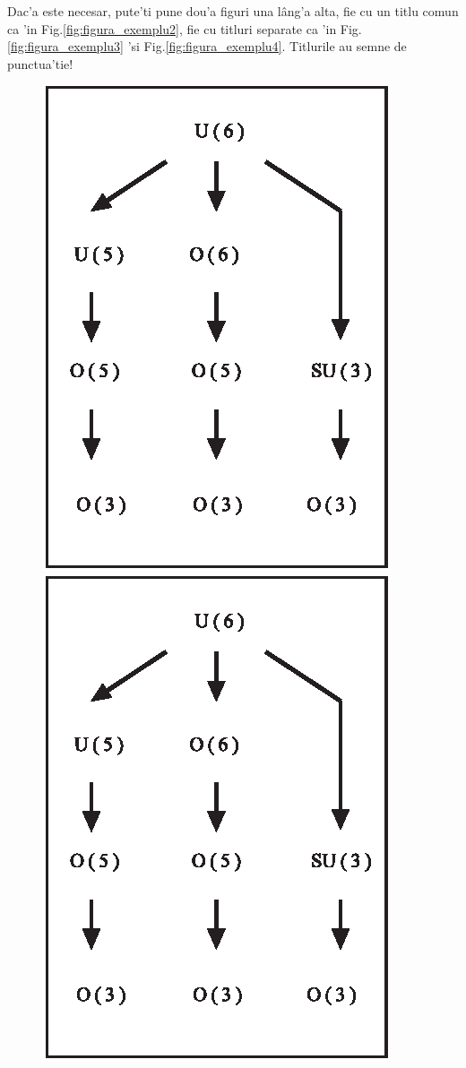 Dac'a este necesar, pute'ti pune dou'a figuri una l\^ang'a alta, fie cu un titlu comun ca 'in Fig.\ref{fig:figura_exemplu2}, fie cu titluri separate ca 'in Fig.\ref{fig:figura_exemplu3} 'si Fig.\ref{fig:figura_exemplu4}. Titlurile au semne de punctua'tie!
\begin{figure}[ht]  %
\begin{minipage}{0.5\textwidth}
\centering
\includegraphics{tex_files/figs/authorfig1.eps}
\end{minipage}
\begin{minipage}{0.5\textwidth}
\centering
\includegraphics{tex_files/figs/authorfig1.eps}

\end{minipage}
\end{figure}
